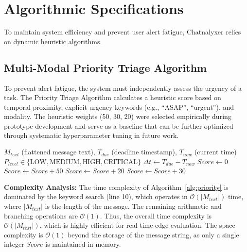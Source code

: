 \section{Algorithmic Specifications}
\label{sec:algorithms}

To maintain system efficiency and prevent user alert fatigue, Chatnalyxer relies on dynamic heuristic algorithms.

\subsection{Multi-Modal Priority Triage Algorithm}
To prevent alert fatigue, the system must independently assess the urgency of a task. The Priority Triage Algorithm calculates a heuristic score based on temporal proximity, explicit urgency keywords (e.g., ``ASAP'', ``urgent''), and modality. The heuristic weights (50, 30, 20) were selected empirically during prototype development and serve as a baseline that can be further optimized through systematic hyperparameter tuning in future work.

\begin{algorithm}[htbp]
\caption{Priority Classification Heuristic}
\label{alg:priority}
\begin{algorithmic}[1]
\REQUIRE $M_{text}$ (flattened message text), $T_{due}$ (deadline timestamp), $T_{now}$ (current time)
\ENSURE $P_{level} \in \{\text{LOW}, \text{MEDIUM}, \text{HIGH}, \text{CRITICAL}\}$
\STATE $\Delta t \leftarrow T_{due} - T_{now}$
\STATE $Score \leftarrow 0$
    \STATE $Score \leftarrow Score + 50$
    \STATE $Score \leftarrow Score + 20$
\ENDIF
{}
    \STATE $Score \leftarrow Score + 30$
\ENDIF
{}
    \RETURN {}
    \RETURN {}
\ELSE
    \RETURN {}
\ENDIF
\end{algorithmic}
\end{algorithm}

\textbf{Complexity Analysis:} The time complexity of Algorithm~\ref{alg:priority} is dominated by the keyword search (line 10), which operates in $\mathcal{O}(|M_{text}|)$ time, where $|M_{text}|$ is the length of the message. The remaining arithmetic and branching operations are $\mathcal{O}(1)$. Thus, the overall time complexity is $\mathcal{O}(|M_{text}|)$, which is highly efficient for real-time edge evaluation. The space complexity is $\mathcal{O}(1)$ beyond the storage of the message string, as only a single integer $Score$ is maintained in memory.
